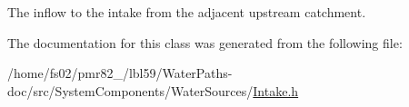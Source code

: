 The inflow to the intake from the adjacent upstream catchment. 



The documentation for this class was generated from the following file\+:\begin{DoxyCompactItemize}
\item 
/home/fs02/pmr82\+\_/lbl59/\+Water\+Paths-\/doc/src/\+System\+Components/\+Water\+Sources/\mbox{\hyperlink{Intake_8h}{Intake.\+h}}\end{DoxyCompactItemize}
